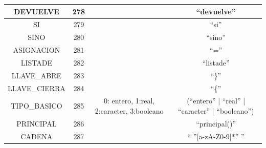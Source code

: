 \documentclass[12pt, spanish]{article}
\begin{document}
\begin{table}[h]
{\begin{tabular}{|c|c|c|c|}
DEVUELVE & 278 &  & ``devuelve'' \\ \hline
SI & 279 &  & ``si'' \\ \hline
SINO & 280 &  & ``sino'' \\ \hline
ASIGNACION & 281 &  & ``='' \\ \hline
LISTADE & 282 &  & ``listade'' \\ \hline
LLAVE\_ABRE & 283 &  & ``\}'' \\ \hline
LLAVE\_CIERRA & 284 &  & ``\{'' \\ \hline
TIPO\_BASICO & 285 & 0: entero, 1:real, 2:caracter, 3:booleano & (``entero'' | ``real'' | ``caracter'' | ``booleano'') \\ \hline
PRINCIPAL & 286 &  & ``principal()'' \\ \hline
CADENA & 287 & & `` ''{[}a-zA-Z0-9{]}*'' '' \\ \hline
\end{tabular}%
}
\end{table}
\end{document}
